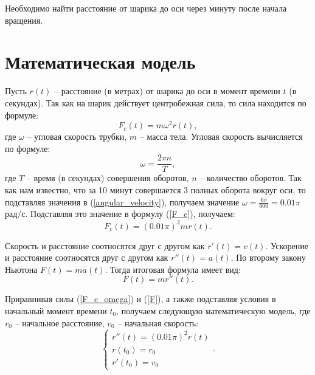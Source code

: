 \documentclass[a4paper,14pt]{extarticle}
\begin{document}
    Необходимо найти расстояние от шарика до оси через минуту после начала вращения.

    \section{Математическая модель}
    Пусть $r(t)$ -- расстояние (в метрах) от шарика до оси в момент времени $t$ (в секундах). 
    Так как на шарик действует центробежная сила, то сила находится по формуле:
    \begin{equation} \label{F_c}
        F_c(t) = m \omega^2 r(t),
    \end{equation}
    где $\omega$ -- угловая скорость трубки, $m$ -- масса тела.
    Угловая скорость вычисляется по формуле:
    \begin{equation} \label{angular_velocity}
        \displaystyle \omega = \frac{2 \pi n}{T},
    \end{equation}
    где $T$ -- время (в секундах) совершения оборотов, $n$ -- количество оборотов.
    Так как нам известно, что за 10 минут совершается 3 полных оборота вокруг оси, то подставляя значения в (\ref{angular_velocity}), получаем значение $\displaystyle \omega = \frac{6 \pi}{600} = 0.01 \pi$ рад/с.
    Подставляя это значение в формулу (\ref{F_c}), получаем:
    \begin{equation} \label{F_c_omega}
        F_c(t) = (0.01 \pi)^2 m r(t).
    \end{equation}

    Скорость и расстояние соотносятся друг с другом как $r'(t) = v(t)$.
    Ускорение и расстояние соотносятся друг с другом как $r''(t) = a(t)$.
    По второму закону Ньютона $F(t) = ma(t)$.
    Тогда итоговая формула имеет вид:
    \begin{equation} \label{F}
        F(t) = m r''(t).
    \end{equation}

    Приравнивая силы (\ref{F_c_omega}) и (\ref{F}), а также подставляя условия в начальный момент времени $t_0$, получаем следующую математическую модель, где $r_0$ -- начальное расстояние, $v_0$ -- начальная скорость:
    \begin{equation*}
        \begin{cases}
            r''(t) = (0.01 \pi)^2 r(t) \\
            r(t_0) = r_0 \\
            r'(t_0) = v_0
        \end{cases}.
    \end{equation*}
\end{document}
